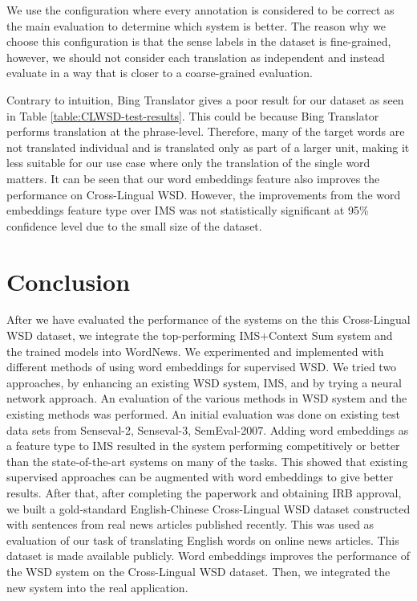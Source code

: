\documentclass[11pt]{article}
\begin{document}
We use the configuration where every annotation is considered to be correct as the main evaluation to determine which system is better. The reason why we choose this configuration is that the sense labels in the dataset is fine-grained, however, we should not consider each translation as independent and instead evaluate in a way that is closer to a coarse-grained evaluation. 

Contrary to intuition, Bing Translator gives a poor result for our dataset as seen in Table \ref{table:CLWSD-test-results}. This could be because Bing Translator performs translation at the phrase-level. Therefore, many of the target words are not translated individual and is translated only as part of a larger unit, making it less suitable for our use case where only the translation of the single word matters. 
It can be seen that our word embeddings feature also improves the performance on Cross-Lingual WSD. However, the improvements from the word embeddings feature type over IMS was not statistically significant at 95\% confidence level due to the small size of the dataset.



\section{Conclusion}
\label{section:conclusion}

After we have evaluated the performance of the systems on the this Cross-Lingual WSD dataset, we integrate the top-performing IMS+Context Sum system and the trained models into WordNews. We experimented and implemented with different methods of using word embeddings for supervised WSD. We tried two approaches, by enhancing an existing WSD system, IMS, and by trying a neural network approach. An evaluation of the various methods in WSD system and the existing methods was performed. An initial evaluation was done on existing test data sets from Senseval-2, Senseval-3, SemEval-2007. Adding word embeddings as a feature type to IMS resulted in the system performing competitively or better than the state-of-the-art systems on many of the tasks. This showed that existing supervised approaches can be augmented with word embeddings to give better results. After that, after completing the paperwork and obtaining IRB approval, we built a gold-standard English-Chinese Cross-Lingual WSD dataset constructed with sentences from real news articles published recently. This was used as evaluation of our task of translating English words on online news articles. This dataset is made available publicly. Word embeddings improves the performance of the WSD system on the Cross-Lingual WSD dataset. Then, we integrated the new system into the real application. 
\end{document}
